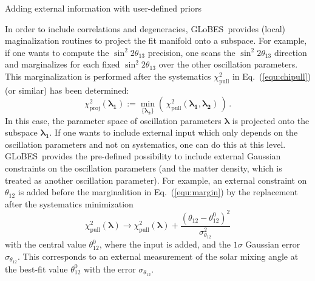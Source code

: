 \documentclass[12pt,a4paper]{article}
\makeatletter
\renewcommand{\section}{\@startsection{section}{1}{0em}{-\baselineskip}%
{\baselineskip}{\normalfont\large\bfseries}}
\newcommand{\eq}{Eq.}
\newcommand{\stheta}{\sin^2 2 \theta_{13}}
\newcommand{\GLOBES}{{\sf GLoBES}}
\newcommand{\equ}[1]{\eq~(\ref{equ:#1})}
\makeatother
\begin{document}
\section{Adding external information with user-defined priors}

In order to include correlations and degeneracies, \GLOBES\ provides
(local) maginalization routines to project the fit manifold onto
a subspace. For example, if one wants to compute the $\stheta$ precision,
one scans the $\stheta$ direction and marginalizes for each fixed $\stheta$
over the other oscillation parameters. This marginalization is performed
after the systematics $\chi^2_{\mathrm{pull}}$ in \equ{chipull} (or similar) 
has been determined:
\begin{equation}
 \chi^2_{\mathrm{proj}}(\boldsymbol{\lambda_1}) := \min_{\{ \boldsymbol{\lambda_2} \} } \left( \, \chi^2_{\mathrm{pull}} (\boldsymbol{\lambda_1} , \boldsymbol{\lambda_2} ) \, \right) \, .
\label{equ:margin}
\end{equation}
In this case, the parameter space of oscillation parameters 
$\boldsymbol{\lambda}$ is projected onto the subspace $\boldsymbol{\lambda_1}$.
If one wants to include external input which only depends on the oscillation
parameters and not on systematics, one can do this at this level. \GLOBES\ provides
the pre-defined possibility to include external Gaussian constraints on the 
oscillation parameters (and the matter density, which is treated as another
oscillation parameter). For example, an external constraint on $\theta_{12}$
is added before the marginalition in \equ{margin} by the replacement after the
systematics minimization
\begin{equation}
 \chi^2_{\mathrm{pull}}(\boldsymbol{\lambda}) \rightarrow \chi^2_{\mathrm{pull}}(\boldsymbol{\lambda})  +
 \frac{(\theta_{12} - \theta_{12}^0)^2}{\sigma_{\theta_{12}}^2}
\label{equ:priors}
\end{equation}
with the central value $\theta_{12}^0$, where the input is added, and
the $1\sigma$ Gaussian error $\sigma_{\theta_{12}}$. This corresponds to an external
measurement of the solar mixing angle at the best-fit value $\theta_{12}^0$
with the error $\sigma_{\theta_{12}}$. 
\end{document}
